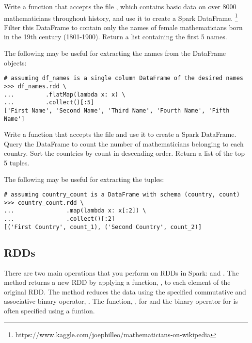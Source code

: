\begin{problem}
Write a function that accepts the file , which contains basic data on over 8000 mathematicians throughout history, and use it to create a Spark DataFrame.
\footnote{https://www.kaggle.com/joephilleo/mathematicians-on-wikipedia}
Filter this DataFrame to contain only the names of female mathematicians born in the 19th century (1801-1900). Return a list containing the first 5 names.

The following may be useful for extracting the names from the DataFrame  objects:
\begin{lstlisting}
# assuming df_names is a single column DataFrame of the desired names
>>> df_names.rdd \
...			.flatMap(lambda x: x) \
...			.collect()[:5]
['First Name', 'Second Name', 'Third Name', 'Fourth Name', 'Fifth Name']
\end{lstlisting}
\label{prob:spark-sql-basic}
\end{problem}

\begin{problem}
Write a function that accepts the file  and use it to create a Spark DataFrame. Query the DataFrame to count the number of mathematicians belonging to each country. Sort the countries by count in descending order. Return a list of the top 5  tuples.

The following may be useful for extracting the \li{(country, count)} tuples:
\begin{lstlisting}
# assuming country_count is a DataFrame with schema (country, count)
>>> country_count.rdd \
...				  .map(lambda x: x[:2]) \
...				  .collect()[:2] 
[('First Country', count_1), ('Second Country', count_2)]
\end{lstlisting}
\label{prob:spark-sql-advanced}
\end{problem}

\subsection*{RDDs} %
There are two main operations that you perform on RDDs in Spark:  and . The  method returns a new RDD by applying a function, , to each element of the original RDD. The  method reduces the data using the specified commutative and associative binary operator, . The function, , for  and the binary operator for  is often specified using a  funtion.

